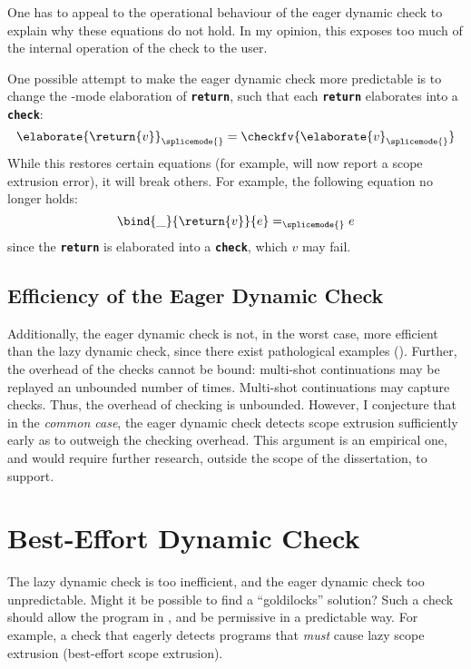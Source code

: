 One has to appeal to the operational behaviour of the eager dynamic check to explain why these equations do not hold. In my opinion, this exposes too much of the internal operation of the check to the user. 

One possible attempt to make the eager dynamic check more predictable is to change the \splicemode{}-mode elaboration of \textbf{\texttt{return}}, such that each \textbf{\texttt{return}} elaborates into a \textbf{\texttt{check}}:
\[\elaborate{\return{v}}_{\splicemode{}} = \checkfv{\elaborate{v}_{\splicemode{}}}\]
While this restores certain equations (for example,  will now report a scope extrusion error), it will break others. For example, the following equation no longer holds:
\[\bind{\_}{\return{v}}{e} =_{\splicemode{}} e\]
since the \textbf{\texttt{return}} is elaborated into a \textbf{\texttt{check}}, which $v$ may fail.

\subsection{Efficiency of the Eager Dynamic Check}\label{subsection:eager-dynamic-efficiency}
Additionally, the eager dynamic check is not, in the worst case, more efficient than the lazy dynamic check, since there exist pathological examples (). Further, the overhead of the checks cannot be bound: multi-shot continuations may be replayed an unbounded number of times. Multi-shot continuations may capture checks. Thus, the overhead of checking is unbounded. However, I conjecture that in the \textit{common case}, the eager dynamic check detects scope extrusion sufficiently early as to outweigh the checking overhead. This argument is an empirical one, and would require further research, outside the scope of the dissertation, to support. 

\section{Best-Effort Dynamic Check}\label{section:best-effort-check}
The lazy dynamic check is too inefficient, and the eager dynamic check too unpredictable. Might it be possible to find a ``goldilocks'' solution? Such a check should allow the program in , and be permissive in a predictable way. For example, a check that eagerly detects programs that \textit{must} cause lazy scope extrusion (best-effort scope extrusion).

